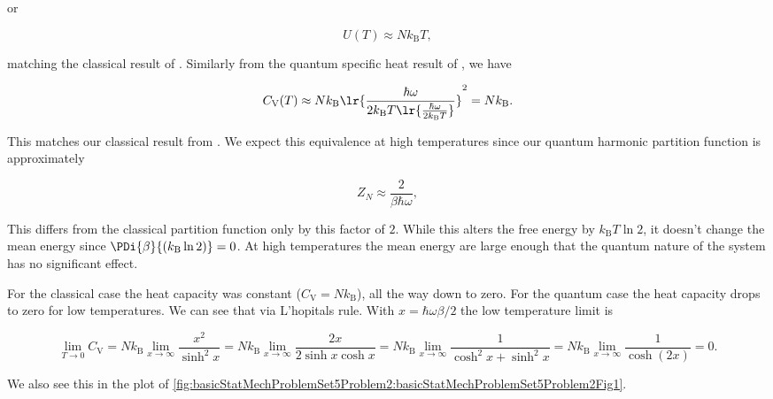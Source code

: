 {or

\begin{equation}\label{eqn:basicStatMechProblemSet5Problem2:400}
U(T) \approx N k_{\mathrm{B}} T,
\end{equation}

matching the classical result of .  Similarly from the quantum specific heat result of , we have

\begin{equation}\label{eqn:basicStatMechProblemSet5Problem2:420}
C_{\mathrm{V}}(T) \approx
N k_{\mathrm{B}}
\lr{\frac{\hbar \omega}{2 k_{\mathrm{B}} T
\lr{ \frac{\hbar \omega}{2 k_{\mathrm{B}} T}}
} }^2
= N k_{\mathrm{B}}.
\end{equation}

This matches our classical result from .  We expect this equivalence at high temperatures since our quantum harmonic partition function  is approximately

\begin{equation}\label{eqn:basicStatMechProblemSet5Problem2:440}
Z_N \approx \frac{2}{\beta \hbar \omega},
\end{equation}

This differs from the classical partition function only by this factor of $2$.  While this alters the free energy by $k_{\mathrm{B}} T \ln 2$, it doesn't change the mean energy since $\PDi{\beta}{(k_{\mathrm{B}} \ln 2)} = 0$.  At high temperatures the mean energy are large enough that the quantum nature of the system has no significant effect.


For the classical case the heat capacity was constant ($C_{\mathrm{V}} = N k_{\mathrm{B}}$), all the way down to zero.  For the quantum case the heat capacity drops to zero for low temperatures.  We can see that via L'hopitals rule.  With $x = \hbar \omega \beta/2$ the low temperature limit is

\begin{dmath}\label{eqn:basicStatMechProblemSet5Problem2:460}
\lim_{T \rightarrow 0} C_{\mathrm{V}} 
= N k_{\mathrm{B}} \lim_{x \rightarrow \infty} 
\frac{x^2}{\sinh^2 x}
= N k_{\mathrm{B}} \lim_{x \rightarrow \infty} 
\frac{2x }{2 \sinh x \cosh x}
= N k_{\mathrm{B}} \lim_{x \rightarrow \infty} 
\frac{1 }{\cosh^2 x + \sinh^2 x}
= N k_{\mathrm{B}} \lim_{x \rightarrow \infty} 
\frac{1 }{\cosh (2 x) }
= 0.
\end{dmath}

We also see this in the plot of \cref{fig:basicStatMechProblemSet5Problem2:basicStatMechProblemSet5Problem2Fig1}.

}
